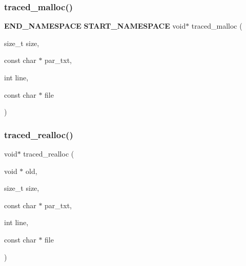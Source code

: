 \mbox{\label{memtrace_8cpp_a30b6aa180e3214beb1f48c5a9381e5ac}} 
\subsubsection{traced\+\_\+malloc()}
{\footnotesize\ttfamily \textbf{ E\+N\+D\+\_\+\+N\+A\+M\+E\+S\+P\+A\+CE} \textbf{ S\+T\+A\+R\+T\+\_\+\+N\+A\+M\+E\+S\+P\+A\+CE} void$\ast$ traced\+\_\+malloc (\begin{DoxyParamCaption}\item[{size\+\_\+t}]{size,  }\item[{const char $\ast$}]{par\+\_\+txt,  }\item[{int}]{line,  }\item[{const char $\ast$}]{file }\end{DoxyParamCaption})}

\mbox{\label{memtrace_8cpp_aa9656d71bfbb848ef518892eb0e3909b}} 
\subsubsection{traced\+\_\+realloc()}
{\footnotesize\ttfamily void$\ast$ traced\+\_\+realloc (\begin{DoxyParamCaption}\item[{void $\ast$}]{old,  }\item[{size\+\_\+t}]{size,  }\item[{const char $\ast$}]{par\+\_\+txt,  }\item[{int}]{line,  }\item[{const char $\ast$}]{file }\end{DoxyParamCaption})}

